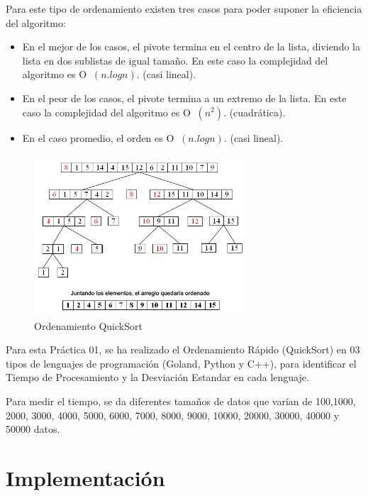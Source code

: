\documentclass{article}
\begin{document}
\begin{enumerate}
    Para este tipo de ordenamiento existen tres casos para poder suponer la eficiencia del algoritmo:
     \begin{itemize}
            \item En el mejor de los casos, el pivote termina en el centro de la lista, diviendo la lista en dos sublistas de igual tamaño. En este caso la complejidad del algoritmo es O $\ (n.logn)$. (casi lineal).
            \item En el peor de los casos, el pivote termina a un extremo de la lista. En este caso la complejidad del algoritmo es O $\ (n^2)$. (cuadrática).
            \item En el caso promedio, el orden es O $\ (n.logn)$. (casi lineal).
    \end{itemize}

\begin{figure}[H]
\centering
\includegraphics[width=0.7\textwidth]{Imagen/Ejem_QuickSort.jpg}
\caption{Ordenamiento QuickSort}
\label{fig:QuickSort}
\end{figure}

   Para esta Práctica 01, se ha realizado el Ordenamiento Rápido (QuickSort) en 03 tipos de lenguajes de programación (Goland, Python y C++), para identificar el Tiempo de Procesamiento y la Desviación Estandar en cada lenguaje.

   Para medir el tiempo, se da diferentes tamaños de datos que varían de 100,1000, 2000, 3000, 4000, 5000, 6000, 7000, 8000, 9000, 10000, 20000, 30000, 40000 y 50000 datos.

\end{enumerate}


\section{Implementación}
\end{document}
